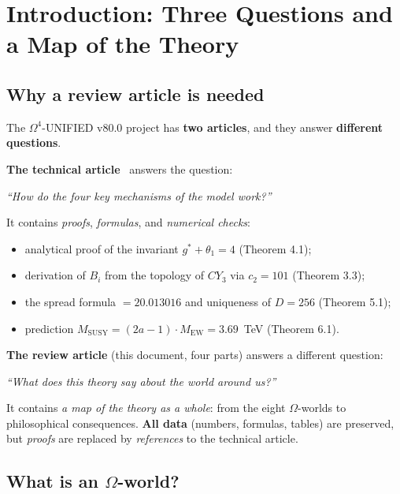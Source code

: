 \documentclass[11pt,a4paper]{article}
\newcommand{\CY}{CY_3}
\newcommand{\Om}{\Omega^4}
\newcommand{\MEW}{M_{\text{EW}}}
\newcommand{\MSUSY}{M_{\text{SUSY}}}
\theoremstyle{definition}
\begin{document}
\vspace{1cm}
\newpage
\tableofcontents
\newpage

\section{Introduction: Three Questions and a Map of the Theory}
\label{sec:intro}

\subsection{Why a review article is needed}

The $\Om$-UNIFIED v80.0 project has \textbf{two articles}, and they 
answer \textbf{different questions}.

\medskip\noindent
\textbf{The technical article}~\cite{matershov_omega4_2026}
answers the question:
\begin{center}
\emph{``How do the four key mechanisms of the model work?''}
\end{center}
It contains \emph{proofs}, \emph{formulas}, and 
\emph{numerical checks}:
\begin{itemize}
    \item analytical proof of the invariant 
          $g^* + \theta_1 = 4$ (Theorem 4.1);
    \item derivation of $B_i$ from the topology of $\CY$ via 
          $c_2 = 101$ (Theorem 3.3);
    \item the spread formula $= 20.013016$ and uniqueness 
          of $D = 256$ (Theorem 5.1);
    \item prediction $\MSUSY = (2a-1) \cdot \MEW = 3.69$~TeV 
          (Theorem 6.1).
\end{itemize}

\medskip\noindent
\textbf{The review article} (this document, four parts) 
answers a different question:
\begin{center}
\emph{``What does this theory say about the world around us?''}
\end{center}
It contains \emph{a map of the theory as a whole}: from the eight 
$\Omega$-worlds to philosophical consequences. \textbf{All data} 
(numbers, formulas, tables) are preserved, but \emph{proofs} 
are replaced by \emph{references} to the technical article.

\subsection{What is an $\Omega$-world?}
\end{document}
